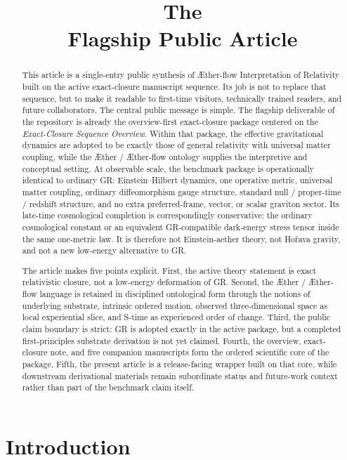 \documentclass[11pt]{article}
\title{\textbf{The \TheoryName{}}\\[0.4em]
\large Flagship Public Article}
\author{}
\date{}
\newcommand{\Aether}{\AE{}ther}
\newcommand{\Aflow}{\AE{}ther-flow}
\newcommand{\TheoryName}{\Aflow{} Interpretation of Relativity}
\begin{document}
\AetherFlowAPATitlePage

\begin{abstract}
This article is a single-entry public synthesis of \TheoryName{} built on the active exact-closure manuscript sequence. Its job is not to replace that sequence, but to make it readable to first-time visitors, technically trained readers, and future collaborators. The central public message is simple. The flagship deliverable of the repository is already the overview-first exact-closure package centered on the \emph{Exact-Closure Sequence Overview}. Within that package, the effective gravitational dynamics are adopted to be exactly those of general relativity with universal matter coupling, while the \Aether{} / \Aflow{} ontology supplies the interpretive and conceptual setting. At observable scale, the benchmark package is operationally identical to ordinary GR: Einstein--Hilbert dynamics, one operative metric, universal matter coupling, ordinary diffeomorphism gauge structure, standard null / proper-time / redshift structure, and no extra preferred-frame, vector, or scalar graviton sector. Its late-time cosmological completion is correspondingly conservative: the ordinary cosmological constant or an equivalent GR-compatible dark-energy stress tensor inside the same one-metric law. It is therefore not Einstein-aether theory, not Ho\v{r}ava gravity, and not a new low-energy alternative to GR.

The article makes five points explicit. First, the active theory statement is exact relativistic closure, not a low-energy deformation of GR. Second, the \Aether{} / \Aflow{} language is retained in disciplined ontological form through the notions of underlying substrate, intrinsic ordered motion, observed three-dimensional space as local experiential slice, and S-time as experienced order of change. Third, the public claim boundary is strict: GR is adopted exactly in the active package, but a completed first-principles substrate derivation is not yet claimed. Fourth, the overview, exact-closure note, and five companion manuscripts form the ordered scientific core of the package. Fifth, the present article is a release-facing wrapper built on that core, while downstream derivational materials remain subordinate status and future-work context rather than part of the benchmark claim itself.
\end{abstract}

\section{Introduction}
\end{document}
